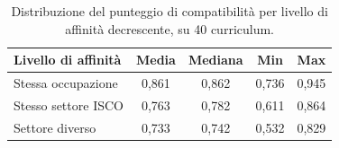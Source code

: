\begin{table}[htbp]
  \centering
  \caption{Distribuzione del punteggio di compatibilità per livello di
           affinità decrescente, su 40 curriculum.}
  \label{tab:monotonia}
  \begin{tabular}{lcccc}
    \toprule
    \textbf{Livello di affinità} & \textbf{Media} & \textbf{Mediana} & \textbf{Min} & \textbf{Max} \\
    \midrule
    Stessa occupazione   & 0,861 & 0,862 & 0,736 & 0,945 \\
    Stesso settore ISCO  & 0,763 & 0,782 & 0,611 & 0,864 \\
    Settore diverso      & 0,733 & 0,742 & 0,532 & 0,829 \\
    \bottomrule
  \end{tabular}
\end{table}
